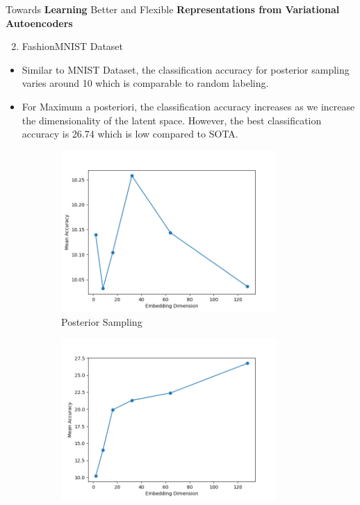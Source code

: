 \documentclass[hyperref={colorlinks,citecolor=blue,linkcolor=blue,urlcolor=blue}]{beamer}
\begin{document}
\begin{frame}{ Towards \textbf{Learning} Better and Flexible \textbf{Representations from Variational Autoencoders} \vspace{0.3em}}
  \begin{enumerate}
    \setcounter{enumi}{1}
    \item FashionMNIST Dataset
  \end{enumerate}
  \begin{itemize}
    \item Similar to MNIST Dataset, the classification accuracy for posterior sampling varies around 10 which is comparable to random labeling.
    \item For Maximum a posteriori, the classification accuracy increases as we increase the dimensionality of the latent space. However, the best classification accuracy is 26.74 which is low compared to SOTA.
  \end{itemize}
  \vspace{-0.5em}
  \begin{figure}
    \begin{subfigure}[b]{0.4\textwidth}
        \centering
        \includegraphics[width=0.9\textwidth,]{./Images/FashionMNIST_VAE_sampling.png}
        \caption{Posterior Sampling}
    \end{subfigure}
    \begin{subfigure}[b]{0.4\textwidth}
        \centering
        \includegraphics[width=0.9\textwidth]{./Images/FashionMNIST_VAE_MAP.png}

\end{subfigure}
\end{figure}
\end{frame}
\end{document}
